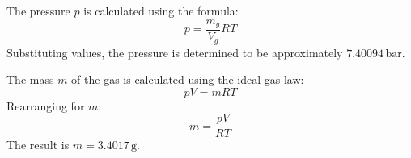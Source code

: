 The pressure \( p \) is calculated using the formula:  
\[
p = \frac{m_g}{V_g} R T
\]  
Substituting values, the pressure is determined to be approximately \( 7.40094 \, \text{bar} \).  

The mass \( m \) of the gas is calculated using the ideal gas law:  
\[
p V = m R T
\]  
Rearranging for \( m \):  
\[
m = \frac{p V}{R T}
\]  
The result is \( m = 3.4017 \, \text{g} \).
